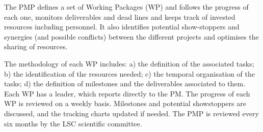 The PMP defines a set of Working Packages (WP) and follows the progress of each one, monitors deliverables and dead lines and keeps track of invested resources including personnel. It also identifies potential show-stoppers and synergies (and possible conflicts) between the different projects and optimises the sharing of resources. 

The methodology of each WP includes: a) the definition of the associated tasks; b) the identification of the resources needed; c) the temporal organisation of the tasks; d) the definition of milestones and the deliverables associated to them. Each WP has a leader, which reports directly to the PM. The progress of each WP is reviewed on a weekly basis. Milestones and potential showstoppers are discussed, and the tracking charts updated if needed. The PMP is reviewed every six months by the LSC scientific committee.  


